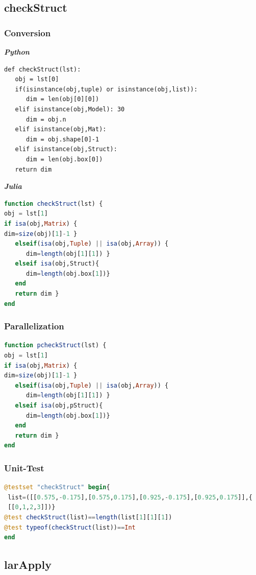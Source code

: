 \documentclass[a4paper,12pt]{article}
\begin{document}
\subsection{checkStruct}
\subsubsection{Conversion}
\textbf{\emph{Python}}
 \lstset{language=Python}
\begin{lstlisting}
def checkStruct(lst):
   obj = lst[0]
   if(isinstance(obj,tuple) or isinstance(obj,list)):
      dim = len(obj[0][0])
   elif isinstance(obj,Model): 30
      dim = obj.n    
   elif isinstance(obj,Mat): 
      dim = obj.shape[0]-1    
   elif isinstance(obj,Struct): 
      dim = len(obj.box[0])    
   return dim
\end{lstlisting}
\textbf {\emph{Julia}}
\begin{lstlisting}[language=Julia, format=Julia]
function checkStruct(lst) {
obj = lst[1]
if isa(obj,Matrix) {
dim=size(obj)[1]-1 }
   elseif(isa(obj,Tuple) || isa(obj,Array)) {
      dim=length(obj[1][1]) }
   elseif isa(obj,Struct){
      dim=length(obj.box[1])}
   end 
   return dim }
end
\end{lstlisting}
\subsubsection{Parallelization}
\begin{lstlisting}[language=Julia, format=Julia]
function pcheckStruct(lst) {
obj = lst[1]
if isa(obj,Matrix) {
dim=size(obj)[1]-1 }
   elseif(isa(obj,Tuple) || isa(obj,Array)) {
      dim=length(obj[1][1]) }
   elseif isa(obj,pStruct){
      dim=length(obj.box[1])}
   end 
   return dim }
end
\end{lstlisting}
\subsubsection{Unit-Test}
\begin{lstlisting}[language=Julia, format=Julia]
@testset "checkStruct" begin{
 list=([[0.575,-0.175],[0.575,0.175],[0.925,-0.175],[0.925,0.175]],{
 [[0,1,2,3]])}
@test checkStruct(list)==length(list[1][1][1])
@test typeof(checkStruct(list))==Int
end
\end{lstlisting}
\newpage
\subsection{larApply}
\end{document}
